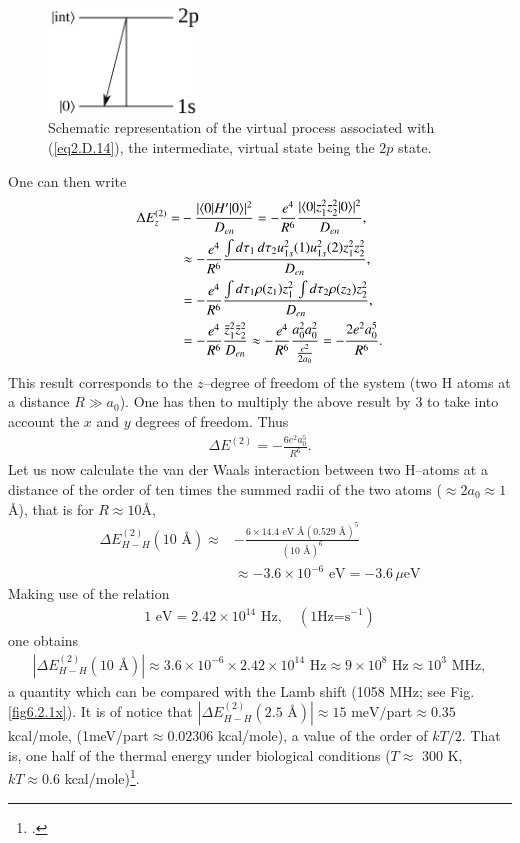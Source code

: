 \begin{subappendices}
        \begin{figure}[h]
         \centerline{\includegraphics*[width=4cm,angle=0]{nutshell/figs/fig2D5_v2.pdf}}
         \caption{Schematic representation of the virtual process associated with (\ref{eq2.D.14}), the intermediate, virtual state being the $2p$ state.}\label{fig2.D.5}
         \end{figure}
  One can then write
  \begin{align}\label{eq2.D.17}
  \nonumber \Delta E_z^{(2)}=&-\frac{|\langle {0|H'|0} \rangle|^2}{D_{en}}=-\frac{e^4}{R^6}\frac{|\langle {0|z_1^2z_2^2|0} \rangle|^2}{D_{en}},\\
\nonumber  &\approx-\frac{e^4}{R^6}\frac{\int d\tau_1\,d\tau_2u^2_{1s}(1)u^2_{1s}(2)z_1^2z_2^2}{D_{en}},\\
\nonumber  &=-\frac{e^4}{R^6}\frac{\int d\tau_1\rho(z_1)z_1^2\,\int d\tau_2\rho(z_2)z_2^2}{D_{en}},\\
&=-\frac{e^4}{R^6}\frac{\bar z_1^2 \bar z_2^2}{D_{en}}\approx-\frac{e^4}{R^6}\frac{a_0^2a_0^2}{\frac{e^2}{2a_0}}=-\frac{2e^2a_0^5}{R^6}.  
   \end{align} 
This result corresponds to the $z$--degree of freedom of the system (two H atoms at a distance $R\gg a_0$). One has then to multiply the above result by 3 to take into account the $x$ and $y$ degrees of freedom. Thus   
   \begin{align}\label{eq2.D.18}
\Delta E^{(2)}=-\frac{6e^2a_0^5}{R^6}.
 \end{align}
Let us now calculate the van der Waals interaction between two H--atoms at a distance of the order of ten times the summed radii of the two atoms ($\approx2a_0\approx1$\AA), that is for $R\approx10$\AA, 
  \begin{align}\label{eq2.D.19}
  \nonumber \Delta E_{H-H}^{(2)}(10\text{ \AA})\approx&-\frac{6\times14.4\text{ eV \AA}(0.529\text{ \AA})^5}{(10\text{ \AA})^6}\\
  &\approx-3.6\times10^{-6}\text{ eV}=-3.6\,\mu\text{eV}  
   \end{align}  
Making use of the relation
\begin{align}\label{eq2.D.20}
1\text{ eV}=2.42\times 10^{14}\text{ Hz},\quad(1\text{Hz=s}^{-1})  
   \end{align}  
 one obtains
\begin{align}\label{eq2.D.21}
|\Delta E_{H-H}^{(2)}(10\text{ \AA})|\approx3.6\times 10^{-6}\times 2.42\times 10^{14}\text{ Hz}\approx9\times10^8\text{ Hz}\approx10^3\text{ MHz},      
\end{align} 
 a quantity which can be compared with the Lamb shift (1058 MHz; see Fig. \ref{fig6.2.1x}). It is of notice that $|\Delta E_{H-H}^{(2)}(2.5\text{ \AA})|\approx15\text{ meV}/$part$\approx0.35$ kcal/mole, (1meV/part$\approx0.02306$ kcal/mole), a value of the order of $kT/2$. That is, one half of the thermal energy under biological conditions ($T\approx$ 300 K, $kT\approx 0.6$ kcal/mole)\footnote{\cite{Huang:05}.}.

\end{subappendices}
